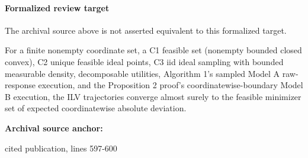 \documentclass[10pt]{article}
\begin{document}
\paragraph{Formalized review target}
The archival source above is not asserted equivalent to this formalized target.
\begin{ReviewVerbatim}
For a finite nonempty coordinate set, a C1 feasible set (nonempty bounded closed convex), C2 unique feasible ideal points, C3 iid ideal sampling with bounded measurable density, decomposable utilities, Algorithm 1's sampled Model A raw-response execution, and the Proposition 2 proof's coordinatewise-boundary Model B execution, the ILV trajectories converge almost surely to the feasible minimizer set of expected coordinatewise absolute deviation.
\end{ReviewVerbatim}

\textbf{Archival source anchor:} {\footnotesize\raggedright cited publication, lines 597-\allowbreak{}600\par}
\end{document}
